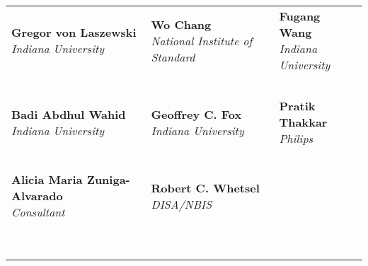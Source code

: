 \begin{center}
\parindent0pt 
\begin{tabular}{p{}p{}p{}}
 \makecell[l]{{\bf Gregor von Laszewski}\\{\it Indiana University}} &
 \makecell[l]{{\bf Wo Chang}\\{\it National Institute of Standard}} &
 \makecell[l]{{\bf Fugang Wang}\\{\it Indiana University}}  \\
\multicolumn{3}{c}{~} \\
 \makecell[l]{{\bf Badi Abdhul Wahid}\\{\it Indiana University}} & 
 \makecell[l]{{\bf Geoffrey C. Fox}\\{\it Indiana University}} &
 \makecell[l]{{\bf Pratik Thakkar}\\{\it Philips}} \\
\multicolumn{3}{c}{~} \\
 \makecell[l]{{\bf Alicia Maria Zuniga-Alvarado}\\{\it Consultant}} &
 \makecell[l]{{\bf Robert C. Whetsel}\\ {\it DISA/NBIS}} \\
 \makecell[l]{~\\~} \\
\end{tabular}
\end{center}

